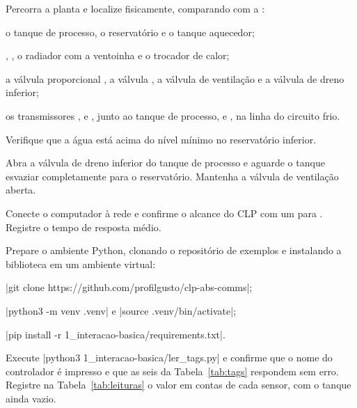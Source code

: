 \begin{roteiro}
  \item Percorra a planta e localize fisicamente, comparando com a :
    \begin{roteiro}
      \item o tanque de processo, o reservatório e o tanque aquecedor;
      \item {}, , o radiador com a ventoinha e o trocador de calor;
      \item a válvula proporcional , a válvula , a válvula de ventilação e a válvula de
        dreno inferior;
      \item os transmissores ,  e , junto ao tanque de processo, e , na linha do
        circuito frio.
    \end{roteiro}
  \item Verifique que a água está acima do nível mínimo no reservatório inferior.
  \item Abra a válvula de dreno inferior do tanque de processo e aguarde o tanque esvaziar completamente para
    o reservatório. Mantenha a válvula de ventilação aberta.
  \item Conecte o computador à rede  e confirme o alcance do CLP com um  para
    . Registre o tempo de resposta médio.
  \item Prepare o ambiente Python, clonando o repositório de exemplos e instalando a biblioteca em um ambiente
    virtual:
    \begin{roteiro}
      \item \cd|git clone https://github.com/profilgusto/clp-abs-comms|;
      \item \cd|python3 -m venv .venv| e \cd|source .venv/bin/activate|;
      \item \cd|pip install -r 1_interacao-basica/requirements.txt|.
    \end{roteiro}
  \item Execute \cd|python3 1_interacao-basica/ler_tags.py| e confirme que o nome do controlador é
    impresso e que as seis  da Tabela~\ref{tab:tags} respondem sem erro. Registre na
    Tabela~\ref{tab:leituras} o valor em contas de cada sensor, com o tanque ainda vazio.

\end{roteiro}
